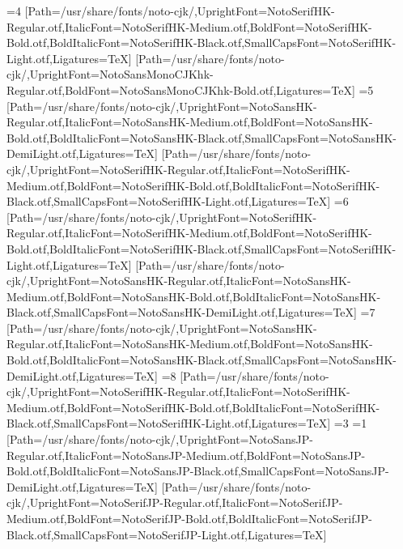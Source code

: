 \else\ifnum\value{CJKFonts}=4
[Path=/usr/share/fonts/noto-cjk/,UprightFont=NotoSerifHK-Regular.otf,ItalicFont=NotoSerifHK-Medium.otf,BoldFont=NotoSerifHK-Bold.otf,BoldItalicFont=NotoSerifHK-Black.otf,SmallCapsFont=NotoSerifHK-Light.otf,Ligatures=TeX]
[Path=/usr/share/fonts/noto-cjk/,UprightFont=NotoSansMonoCJKhk-Regular.otf,BoldFont=NotoSansMonoCJKhk-Bold.otf,Ligatures=TeX]
\else\ifnum\value{CJKFonts}=5
[Path=/usr/share/fonts/noto-cjk/,UprightFont=NotoSansHK-Regular.otf,ItalicFont=NotoSansHK-Medium.otf,BoldFont=NotoSansHK-Bold.otf,BoldItalicFont=NotoSansHK-Black.otf,SmallCapsFont=NotoSansHK-DemiLight.otf,Ligatures=TeX]
[Path=/usr/share/fonts/noto-cjk/,UprightFont=NotoSerifHK-Regular.otf,ItalicFont=NotoSerifHK-Medium.otf,BoldFont=NotoSerifHK-Bold.otf,BoldItalicFont=NotoSerifHK-Black.otf,SmallCapsFont=NotoSerifHK-Light.otf,Ligatures=TeX]
\else\ifnum\value{CJKFonts}=6
[Path=/usr/share/fonts/noto-cjk/,UprightFont=NotoSerifHK-Regular.otf,ItalicFont=NotoSerifHK-Medium.otf,BoldFont=NotoSerifHK-Bold.otf,BoldItalicFont=NotoSerifHK-Black.otf,SmallCapsFont=NotoSerifHK-Light.otf,Ligatures=TeX]
[Path=/usr/share/fonts/noto-cjk/,UprightFont=NotoSansHK-Regular.otf,ItalicFont=NotoSansHK-Medium.otf,BoldFont=NotoSansHK-Bold.otf,BoldItalicFont=NotoSansHK-Black.otf,SmallCapsFont=NotoSansHK-DemiLight.otf,Ligatures=TeX]
\else\ifnum\value{CJKFonts}=7
[Path=/usr/share/fonts/noto-cjk/,UprightFont=NotoSansHK-Regular.otf,ItalicFont=NotoSansHK-Medium.otf,BoldFont=NotoSansHK-Bold.otf,BoldItalicFont=NotoSansHK-Black.otf,SmallCapsFont=NotoSansHK-DemiLight.otf,Ligatures=TeX]
\else\ifnum\value{CJKFonts}=8
[Path=/usr/share/fonts/noto-cjk/,UprightFont=NotoSerifHK-Regular.otf,ItalicFont=NotoSerifHK-Medium.otf,BoldFont=NotoSerifHK-Bold.otf,BoldItalicFont=NotoSerifHK-Black.otf,SmallCapsFont=NotoSerifHK-Light.otf,Ligatures=TeX]
\fi\fi\fi\fi\fi\fi\fi\fi\else
\ifnum\value{CJKLanguage}=3
\ifnum\value{CJKFonts}=1
[Path=/usr/share/fonts/noto-cjk/,UprightFont=NotoSansJP-Regular.otf,ItalicFont=NotoSansJP-Medium.otf,BoldFont=NotoSansJP-Bold.otf,BoldItalicFont=NotoSansJP-Black.otf,SmallCapsFont=NotoSansJP-DemiLight.otf,Ligatures=TeX]
[Path=/usr/share/fonts/noto-cjk/,UprightFont=NotoSerifJP-Regular.otf,ItalicFont=NotoSerifJP-Medium.otf,BoldFont=NotoSerifJP-Bold.otf,BoldItalicFont=NotoSerifJP-Black.otf,SmallCapsFont=NotoSerifJP-Light.otf,Ligatures=TeX]
